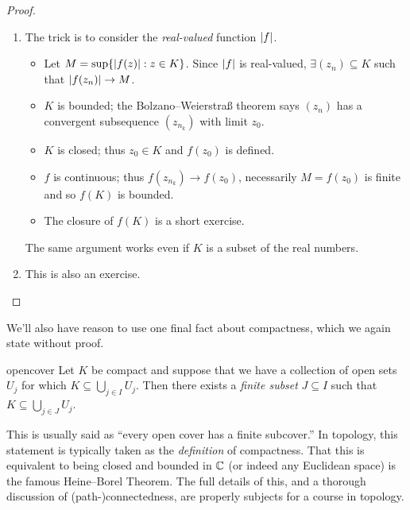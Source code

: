 \begin{proof}{}{}
\begin{enumerate}
  \item The trick is to consider the \emph{real-valued} function $\left| f\right|$.
\begin{itemize}
  \item Let $M=\sup\{\left| f(z)\right|:z\in K\}$. Since $\left| f\right|$ is real-valued, $\exists (z_n)\subseteq K$ such that $\left| f(z_n)\right|\to M$.
  \item $K$ is bounded; the Bolzano--Weierstraß theorem says $(z_n)$ has a convergent subsequence $(z_{n_k})$ with limit $z_0$.
  \item $K$ is closed; thus $z_0\in K$ and $f(z_0)$ is defined.
  \item $f$ is continuous; thus $f(z_{n_k})\to f(z_0)$, necessarily $M=f(z_0)$ is finite and so $f(K)$ is bounded.
  \item The closure of $f(K)$ is a short exercise.
\end{itemize}
The same argument works even if $K$ is a subset of the real numbers.
	\item This is also an exercise.\qedhere %
\end{enumerate}
\end{proof}

We'll also have reason to use one final fact about compactness, which we again state without proof.

\begin{thm}{}{opencover}
Let $K$ be compact and suppose that we have a collection of open sets $U_j$ for which $K\subseteq \bigcup\limits_{j\in I} U_j$. Then there exists a \emph{finite subset} $J\subseteq I$ such that $K\subseteq \bigcup\limits_{j\in J} U_j$.
\end{thm}

This is usually said as ``every open cover has a finite subcover.'' In topology, this statement is typically taken as the \emph{definition} of compactness. That this is equivalent to being closed and bounded in $\mathbb{C}$ (or indeed any Euclidean space) is the famous Heine--Borel Theorem. The full details of this, and a thorough discussion of (path-)connectedness, are properly subjects for a course in topology.

